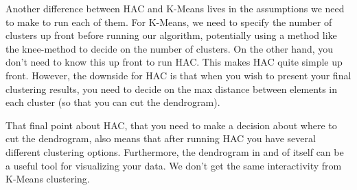 Another difference between HAC and K-Means lives in the assumptions we need to make to run each of them. For K-Means, we need to specify the number of clusters up front before running our algorithm, potentially using a method like the knee-method to decide on the number of clusters. On the other hand, you don't need to know this up front to run HAC. This makes HAC quite simple up front. However, the downside for HAC is that when you wish to present your final clustering results, you need to decide on the max distance between elements in each cluster (so that you can cut the dendrogram).

That final point about HAC, that you need to make a decision about where to cut the dendrogram, also means that after running HAC you have several different clustering options. Furthermore, the dendrogram in and of itself can be a useful tool for visualizing your data. We don't get the same interactivity from K-Means clustering.

